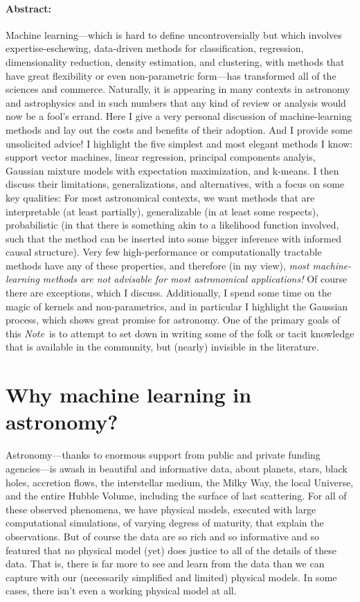 \documentclass[12pt, letterpaper]{article}
\newcommand{\documentname}{\textsl{Note}}
\begin{document}
\paragraph{Abstract:}
Machine learning---which is hard to define uncontroversially
but which involves expertise-eschewing, data-driven methods for classification,
regression, dimensionality reduction, density estimation, and clustering,
with methods that have great flexibility or even non-parametric form---has transformed all
of the sciences and commerce.
Naturally, it is appearing in many contexts in astronomy and astrophysics and
in such numbers that any kind of review or analysis would now be a fool's errand.
Here I give a very personal discussion of machine-learning methods and lay out the costs and
benefits of their adoption.
And I provide some unsolicited advice!
I highlight the five simplest and most elegant methods I know: support vector
machines, linear regression, principal components analyis, Gaussian mixture models
with expectation maximization, and k-means.
I then discuss their limitations, generalizations, and alternatives, with a focus
on some key qualities:
For most astronomical contexts, we want methods that are interpretable (at least
partially), generalizable (in at least some respects), probabilistic (in that
there is something akin to a likelihood function involved, such that the method can
be inserted into some bigger inference with informed causal structure).
Very few high-performance or computationally tractable methods have any of these
properties, and therefore (in my view),
\emph{most machine-learning methods are not advisable for most astronomical
applications!}
Of course there are exceptions, which I discuss.
Additionally, I spend some time on the magic of kernels and non-parametrics, and in particular
I highlight the Gaussian process, which shows great promise for astronomy.
One of the primary goals of this \documentname\ is to attempt to set down in writing
some of the folk or tacit knowledge that is available in the community, but
(nearly) invisible in the literature.

\clearpage\section{Why machine learning in astronomy?}

Astronomy---thanks to enormous support from public and private funding
agencies---is awash in beautiful and informative data, about planets, stars,
black holes, accretion flows,
the interstellar medium, the Milky Way, the local Universe, and the entire
Hubble Volume, including the surface of last scattering.
For all of these observed phenomena, we have physical models, executed
with large computational simulations, of varying degress of maturity,
that explain the observations.
But of course the data are so rich and so informative and so featured
that no physical model (yet) does justice to all of the details of these
data.
That is, there is far more to see and learn from the data than we can
capture with our (necessarily simplified and limited) physical models.
In some cases, there isn't even a working physical model at all.
\end{document}
